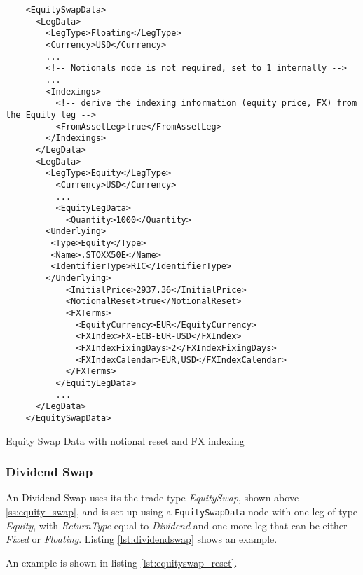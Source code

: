 \begin{listing}[H]
\begin{verbatim}
    <EquitySwapData>
      <LegData>
        <LegType>Floating</LegType>
        <Currency>USD</Currency>
        ...
        <!-- Notionals node is not required, set to 1 internally -->
        ...
        <Indexings>
          <!-- derive the indexing information (equity price, FX) from the Equity leg -->
          <FromAssetLeg>true</FromAssetLeg>
        </Indexings>
      </LegData>
      <LegData>
        <LegType>Equity</LegType>
          <Currency>USD</Currency>
          ...
          <EquityLegData>
            <Quantity>1000</Quantity>
		<Underlying>
		 <Type>Equity</Type>
		 <Name>.STOXX50E</Name>
		 <IdentifierType>RIC</IdentifierType>
		</Underlying>
            <InitialPrice>2937.36</InitialPrice>
            <NotionalReset>true</NotionalReset>
            <FXTerms>
              <EquityCurrency>EUR</EquityCurrency>
              <FXIndex>FX-ECB-EUR-USD</FXIndex>
              <FXIndexFixingDays>2</FXIndexFixingDays>
              <FXIndexCalendar>EUR,USD</FXIndexCalendar>
            </FXTerms>
          </EquityLegData>
          ...
      </LegData>
    </EquitySwapData>
\end{verbatim}
\caption{Equity Swap Data with notional reset and FX indexing}
\label{lst:equityswap_reset}
\end{listing}

\subsubsection{Dividend Swap}
\label{ss:dividend_swap}

An Dividend Swap uses its the trade type \emph{EquitySwap}, shown above \ref{ss:equity_swap}, and is set up using a {\tt EquitySwapData} node with one leg of type  \emph{Equity}, with \emph{ReturnType} equal to \emph{Dividend} and one more leg that can be either \emph{Fixed} or  \emph{Floating}. Listing \ref{lst:dividendswap} shows an example.

An example is shown in listing \ref{lst:equityswap_reset}.


